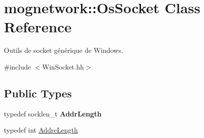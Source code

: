 \hypertarget{classmognetwork_1_1_os_socket}{\section{mognetwork\-:\-:Os\-Socket Class Reference}
\label{classmognetwork_1_1_os_socket}
}


Outils de socket générique de Windows.  




{\ttfamily \#include $<$Win\-Socket.\-hh$>$}

\subsection*{Public Types}
\begin{DoxyCompactItemize}
\item 
\hypertarget{classmognetwork_1_1_os_socket_a10e453b27c0954f12f5dbf74bf9853c0}{typedef socklen\-\_\-t {\bfseries Addr\-Length}}\label{classmognetwork_1_1_os_socket_a10e453b27c0954f12f5dbf74bf9853c0}

\item 
typedef int \hyperlink{classmognetwork_1_1_os_socket_a53fd4fa9dc6b02cafdb4b7a2b6d94778}{Addre\-Length}
\end{DoxyCompactItemize}
